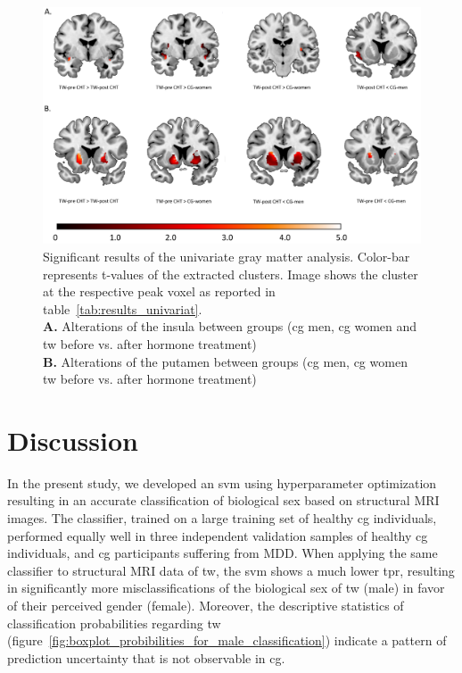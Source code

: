 \documentclass{article}
\begin{document}
    \begin{figure}[ht]
        \begin{center}
            \includegraphics[scale=0.13]{img/results_univariate_gray_matter_analysis.png}
        \end{center}
        \caption[]{Significant results of the univariate gray matter analysis. Color-bar represents t-values of the extracted clusters. Image shows the cluster at the respective peak voxel as reported in table~\ref{tab:results_univariat}. \\
        \textbf{A.} Alterations of the insula between groups (\acl{cg} men, \acl{cg} women and \acl{tw} before vs. after hormone treatment)\\
        \textbf{B.} Alterations of the putamen between groups (\acl{cg} men, \acl{cg} women \acl{tw} before vs. after hormone treatment)
        }
        \label{fig:results_univariate_gray_matter_analysis}
    \end{figure}


    \section{Discussion}
    In the present study, we developed an \ac{svm} using hyperparameter optimization resulting in an accurate classification of biological sex based on structural MRI images. The classifier, trained on a large training set of healthy \ac{cg} individuals, performed equally well in three independent validation samples of healthy \ac{cg} individuals, and \ac{cg} participants suffering from MDD. When applying the same classifier to structural MRI data of \ac{tw}, the \ac{svm} shows a much lower \ac{tpr}, resulting in significantly more misclassifications of the biological sex of \ac{tw} (male) in favor of their perceived gender (female). Moreover, the descriptive statistics of classification probabilities regarding \ac{tw} (figure~\ref{fig:boxplot_probibilities_for_male_classification}) indicate a pattern of prediction uncertainty that is not observable in \ac{cg}.
\end{document}

